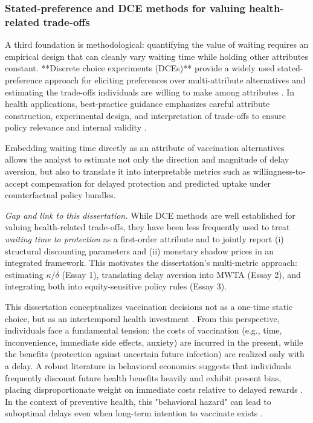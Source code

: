 \documentclass[doublespacing]{utdthesis}
\let\cite=\citep
\begin{document}
\subsubsection{Stated-preference and DCE methods for valuing health-related trade-offs}A third foundation is methodological: quantifying the value of waiting requires an empirical design that can cleanly vary waiting time while holding other attributes constant. **Discrete choice experiments (DCEs)** provide a widely used stated-preference approach for eliciting preferences over multi-attribute alternatives and estimating the trade-offs individuals are willing to make among attributes \cite{Louviere2000, Train2009, deBekkerGrob2012}. In health applications, best-practice guidance emphasizes careful attribute construction, experimental design, and interpretation of trade-offs to ensure policy relevance and internal validity \cite{Johnson2013ISPOR, LancsarLouviere2008}.

Embedding waiting time directly as an attribute of vaccination alternatives allows the analyst to estimate not only the direction and magnitude of delay aversion, but also to translate it into interpretable metrics such as willingness-to-accept compensation for delayed protection and predicted uptake under counterfactual policy bundles.

\textit{Gap and link to this dissertation.} While DCE methods are well established for valuing health-related trade-offs, they have been less frequently used to treat \emph{waiting time to protection} as a first-order attribute and to jointly report (i) structural discounting parameters and (ii) monetary shadow prices in an integrated framework. This motivates the dissertation’s multi-metric approach: estimating $\kappa/\delta$ (Essay 1), translating delay aversion into MWTA (Essay 2), and integrating both into equity-sensitive policy rules (Essay 3).



This dissertation conceptualizes vaccination decisions not as a one-time static choice, but as an intertemporal health investment \cite{Grossman1972, Cropper1977}. From this perspective, individuals face a fundamental tension: the costs of vaccination (e.g., time, inconvenience, immediate side effects, anxiety) are incurred in the present, while the benefits (protection against uncertain future infection) are realized only with a delay. A robust literature in behavioral economics suggests that individuals frequently discount future health benefits heavily and exhibit present bias, placing disproportionate weight on immediate costs relative to delayed rewards \cite{Laibson1997, ODonoghueRabin1999, Frederick2002}. In the context of preventive health, this "behavioral hazard" can lead to suboptimal delays even when long-term intention to vaccinate exists \cite{Baicker2011, Chapman2005}.
\end{document}
